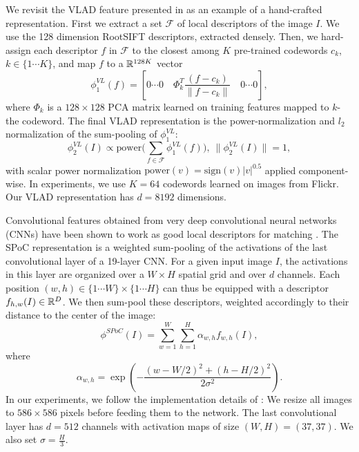We revisit the VLAD feature presented in \cite{VLAD} as an example of a hand-crafted representation. First we extract a set $\mathcal{F}$ of local descriptors of the image $I$. We use the 128 dimension RootSIFT \cite{3things} descriptors, extracted densely. 
Then, we hard-assign each descriptor $f$ in $\mathcal{F}$ to the closest among $K$ pre-trained codewords $c_k$, $k\in\{1\cdots K\}$,
and map $f$ to a $\mathbb R^{128K}$ vector 
\begin{equation}
\phi^{VL}_1(f) = \left[0 \cdots 0\quad \Phi_k^T\frac{(f-c_k)}{\|f-c_k\|} \quad 0 \cdots 0\right],
\end{equation}
where $\Phi_k$ is a $128\times 128$ PCA matrix learned on training features mapped to $k$-the codeword.
The final VLAD representation is the power-normalization and $l_2$ normalization of the sum-pooling of $\phi^{VL}_1$:
\begin{equation}
\phi^{VL}_2(I) \propto \mathrm{power}\big(\sum_{f\in \mathcal{F}}\phi^{VL}_1(f)\big),~\|\phi^{VL}_2(I)\|=1,
\end{equation}
with scalar power normalization $\mathrm{power}(v)=\mathrm{sign}(v)|v|^{0.5}$ applied component-wise.
In experiments, we use $K=64$ codewords learned on images from Flickr. Our VLAD representation has $d=8192$ dimensions.

Convolutional features obtained from very deep convolutional neural networks (CNNs) have been shown to work as good local descriptors for matching \cite{SimonZisser15}. The SPoC representation \cite{babenko15} is a weighted sum-pooling of the activations of the last convolutional layer of a 19-layer CNN. For a given input image $I$, the activations in this layer are organized over a $W\times H$ spatial grid and over $d$ channels. Each position $(w,h)\in \{1 \cdots W\}\times \{1\cdots H\}$ can thus be equipped with a descriptor $f_{h,w}(I)\in\mathbb R^D$. 
We then sum-pool these descriptors, weighted accordingly to their distance to the center of the image:
\begin{equation}
    \phi^{SPoC}(I) = \sum_{w=1}^W\sum_{h=1}^H \alpha_{w,h}f_{w,h}(I),
\end{equation}
where
\begin{equation}
    \alpha_{w,h} = \exp \left(-\dfrac{(w-W/2)^2+(h-H/2)^2}{2\sigma^2}\right).
\end{equation}
In our experiments, we follow the implementation details of \cite{babenko15}: We resize all images to $586\times 586$ pixels before feeding them to the network. The last convolutional layer has $d=512$ channels with activation maps of size $(W,H)=(37,37)$. We also set $\sigma=\frac{H}{3}$.

